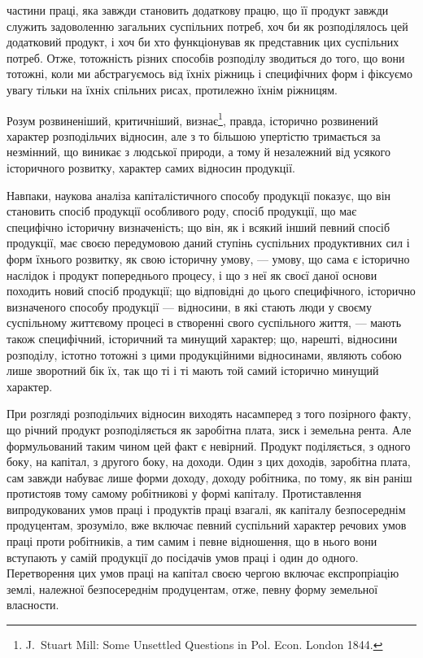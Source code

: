 \parcont{}  %
частини праці, яка завжди становить додаткову працю, що її продукт завжди
служить задоволенню загальних суспільних потреб, хоч би як розподілялось
цей додатковий продукт, і хоч би хто функціонував як представник цих суспільних
потреб. Отже, тотожність різних способів розподілу зводиться до того,
що вони тотожні, коли ми абстрагуємось від їхніх ріжниць і специфічних форм
і фіксуємо увагу тільки на їхніх спільних рисах, протилежно їхнім ріжницям.

Розум розвиненіший, критичніший, визнає\footnote{
J.~Stuart Mill: Some Unsettled Questions in Pol. Econ. London 1844.
}, правда, історично розвинений
характер розподільчих відносин, але з то більшою упертістю тримається за незмінний,
що виникає з людської природи, а тому й незалежний від усякого історичного
розвитку, характер самих відносин продукції.

Навпаки, наукова аналіза капіталістичного способу продукції показує, що
він становить спосіб продукції особливого роду, спосіб продукції, що має специфічно
історичну визначеність; що він, як і всякий інший певний спосіб продукції,
має своєю передумовою даний ступінь суспільних продуктивних сил і
форм їхнього розвитку, як свою історичну умову, — умову, що сама є історично
наслідок і продукт попереднього процесу, і що з неї як своєї даної основи
походить новий спосіб продукції; що відповідні до цього специфічного, історично
визначеного способу продукції — відносини, в які стають
люди у своєму суспільному життєвому процесі в створенні свого суспільного
життя, — мають також специфічний, історичний та минущий характер; що, нарешті,
відносини розподілу, істотно тотожні з цими продукційними відносинами,
являють собою лише зворотний бік їх, так що ті і ті мають той самий
історично минущий характер.

При розгляді розподільчих відносин виходять насамперед з того позірного
факту, що річний продукт розподіляється як заробітна плата, зиск і земельна
рента. Але формульований таким чином цей факт є невірний. Продукт поділяється,
з одного боку, на капітал, з другого боку, на доходи. Один з цих доходів,
заробітна плата, сам завжди набуває лише форми доходу, доходу робітника, по
тому, як він раніш протистояв тому самому робітникові у формі капіталу.
Протиставлення випродукованих умов праці і продуктів праці взагалі, як капіталу
безпосереднім продуцентам, зрозуміло, вже включає певний суспільний характер
речових умов праці проти робітників, а тим самим і певне відношення, що
в нього вони вступають у самій продукції до посідачів умов праці і один
до одного. Перетворення цих умов праці на капітал своєю чергою включає
експропріацію землі, належної безпосереднім продуцентам, отже, певну форму
земельної власности.

